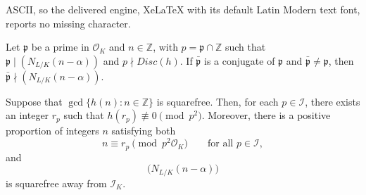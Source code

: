 \documentclass[10pt,a4paper]{amsart}
\newcommand{\ZZ}{\mathbb{Z}}
\newcommand{\cO}{\mathcal{O}}
\begin{document}
ASCII, so the delivered engine, XeLaTeX with its default Latin Modern text font, reports no missing character.
\begin{proposition}
\label{prop: conjugatenotdividing}
      Let \(\mathfrak{p}\) be a prime in $\cO_K$ and $n \in \ZZ$, with $p=\mathfrak{p}\cap \mathbb{Z}$  such that $\mathfrak{p} \mid (N_{L/K}(n - \alpha))$ and $p\nmid Disc(h)$. If $\bar{\mathfrak{p}}$ is a conjugate of $\mathfrak p$ and $\bar{\mathfrak{p}} \neq \mathfrak{p} $, then  $\bar{\mathfrak{p}} \nmid (N_{L/K}(n - \alpha))$.
\end{proposition}

\begin{proposition}
\label{prop: sieve}
Suppose that $\gcd\{h(n):n\in\mathbb{Z}\}$ is squarefree. Then, for each $p\in\mathcal{I}$, there exists an integer $r_p$ such that $h(r_p)\not\equiv 0\pmod{p^2}$. Moreover, there is a positive proportion of integers $n$ satisfying both
    \[
        n\equiv r_p\pmod{p^2\mathcal{O}_K}
        \qquad\text{for all }p\in\mathcal{I},
    \]
and
    \[
        \bigl(N_{L/K}(n-\alpha)\bigr)
    \]
is squarefree away from $\mathcal{I}_K$.
\end{proposition}
\end{document}
